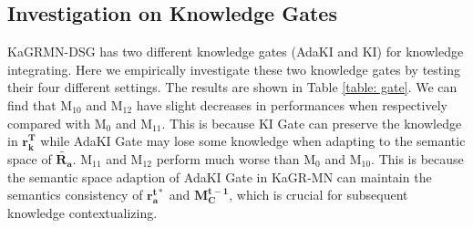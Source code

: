 \subsection{Investigation on Knowledge Gates} \label{sec: gate}
\begin{table*}[t]
\fontsize{8}{11}\selectfont
\centering
\caption{Results of different knowledge gate settings.}
\label{table: gate}
\end{table*}
KaGRMN-DSG has two different knowledge gates (AdaKI and KI) for knowledge integrating.
Here we empirically investigate these two knowledge gates by testing their four different settings.
The results are shown in Table \ref{table: gate}.
We can find that M$_{10}$ and M$_{12}$ have slight decreases in performances when respectively compared with M$_0$ and M$_{11}$.
This is because KI Gate can preserve the knowledge in $\mathbf{r_k^\mathbf{T}}$ while AdaKI Gate may lose some knowledge when adapting to the semantic space of $\mathbf{\widetilde{R_a}}$.
M$_{11}$ and M$_{12}$ perform much worse than M$_0$ and M$_{10}$.
This is because the semantic space adaption of AdaKI Gate in KaGR-MN can maintain the semantics consistency of $\mathbf{r_a^{t*}}$ and $\mathbf{M_C^{t-1}}$, which is crucial for subsequent knowledge contextualizing.




